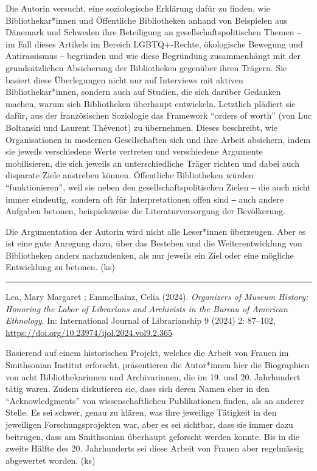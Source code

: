 \documentclass[a4paper,
fontsize=11pt,
oneside,
numbers=noperiodatend,
parskip=half-,
bibliography=totoc,
final
]{scrartcl}
\begin{document}
Die Autorin versucht, eine soziologische Erklärung dafür zu finden, wie
Bibliothekar*innen und Öffentliche Bibliotheken anhand von Beispielen
aus Dänemark und Schweden ihre Beteiligung an gesellschaftspolitischen
Themen ‒ im Fall dieses Artikels im Bereich LGBTQ+-Rechte, ökologische
Bewegung und Antirassismus ‒ begründen und wie diese Begründung
zusammenhängt mit der grundsätzlichen Absicherung der Bibliotheken
gegenüber ihren Trägern. Sie basiert diese Überlegungen nicht nur auf
Interviews mit aktiven Bibliothekar*innen, sondern auch auf Studien, die
sich darüber Gedanken machen, warum sich Bibliotheken überhaupt
entwickeln. Letztlich plädiert sie dafür, aus der französischen
Soziologie das Framework \enquote{orders of worth} (von Luc Boltanski
und Laurent Thévenot) zu übernehmen. Dieses beschreibt, wie
Organisationen in modernen Gesellschaften sich und ihre Arbeit
absichern, indem sie jeweils verschiedene Werte vertreten und
verschiedene Argumente mobilisieren, die sich jeweils an
unterschiedliche Träger richten und dabei auch disparate Ziele anstreben
können. Öffentliche Bibliotheken würden \enquote{funktionieren}, weil
sie neben den gesellschaftspolitischen Zielen ‒ die auch nicht immer
eindeutig, sondern oft für Interpretationen offen sind ‒ auch andere
Aufgaben betonen, beispielsweise die Literaturversorgung der
Bevölkerung.

Die Argumentation der Autorin wird nicht alle Leser*innen überzeugen.
Aber es ist eine gute Anregung dazu, über das Bestehen und die
Weiterentwicklung von Bibliotheken anders nachzudenken, als nur jeweils
ein Ziel oder eine mögliche Entwicklung zu betonen. (ks)

\begin{center}\rule{0.5\linewidth}{0.5pt}\end{center}

Lea, Mary Margaret ; Emmelhainz, Celia (2024). \emph{Organizers of
Museum History: Honoring the Labor of Librarians and Archivists in the
Bureau of American Ethnology}. In: International Journal of
Librarianship 9 (2024) 2: 87--102,
\url{https://doi.org/10.23974/ijol.2024.vol9.2.365}

Basierend auf einem historischen Projekt, welches die Arbeit von Frauen
im Smithsonian Institut erforscht, präsentieren die Autor*innen hier die
Biographien von acht Bibliothekarinnen und Archivarinnen, die im 19. und
20. Jahrhundert tätig waren. Zudem diskutieren sie, dass sich deren
Namen eher in den \enquote{Acknowledgments} von wissenschaftlichen
Publikationen finden, als an anderer Stelle. Es sei schwer, genau zu
klären, was ihre jeweilige Tätigkeit in den jeweiligen
Forschungsprojekten war, aber es sei sichtbar, dass sie immer dazu
beitrugen, dass am Smithsonian überhaupt geforscht werden konnte. Bis in
die zweite Hälfte des 20. Jahrhunderts sei diese Arbeit von Frauen aber
regelmässig abgewertet worden. (ks)
\end{document}
